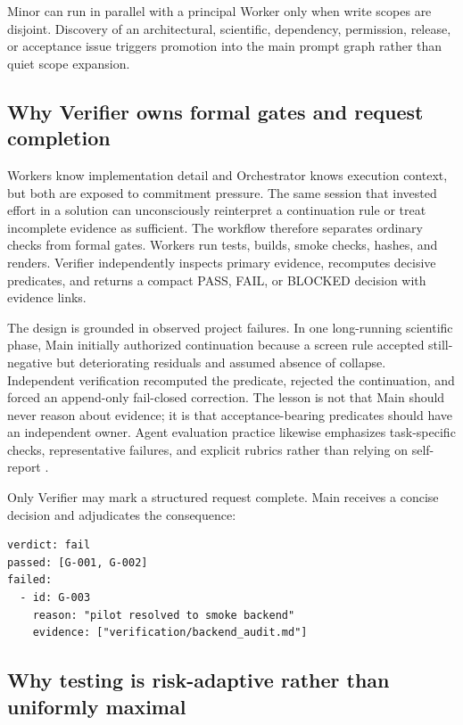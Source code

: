 \documentclass[11pt,a4paper]{article}
\begin{document}
Minor can run in parallel with a principal Worker only when write scopes are disjoint. Discovery of an architectural, scientific, dependency, permission, release, or acceptance issue triggers promotion into the main prompt graph rather than quiet scope expansion.

\subsection{Why Verifier owns formal gates and request completion}

Workers know implementation detail and Orchestrator knows execution context, but both are exposed to commitment pressure. The same session that invested effort in a solution can unconsciously reinterpret a continuation rule or treat incomplete evidence as sufficient. The workflow therefore separates ordinary checks from formal gates. Workers run tests, builds, smoke checks, hashes, and renders. Verifier independently inspects primary evidence, recomputes decisive predicates, and returns a compact PASS, FAIL, or BLOCKED decision with evidence links.

The design is grounded in observed project failures. In one long-running scientific phase, Main initially authorized continuation because a screen rule accepted still-negative but deteriorating residuals and assumed absence of collapse. Independent verification recomputed the predicate, rejected the continuation, and forced an append-only fail-closed correction. The lesson is not that Main should never reason about evidence; it is that acceptance-bearing predicates should have an independent owner. Agent evaluation practice likewise emphasizes task-specific checks, representative failures, and explicit rubrics rather than relying on self-report \cite{anthropicevals2026,yao2024taubench}.

Only Verifier may mark a structured request complete. Main receives a concise decision and adjudicates the consequence:

\begin{lstlisting}[style=workflow]
verdict: fail
passed: [G-001, G-002]
failed:
  - id: G-003
    reason: "pilot resolved to smoke backend"
    evidence: ["verification/backend_audit.md"]
\end{lstlisting}

\subsection{Why testing is risk-adaptive rather than uniformly maximal}
\end{document}
